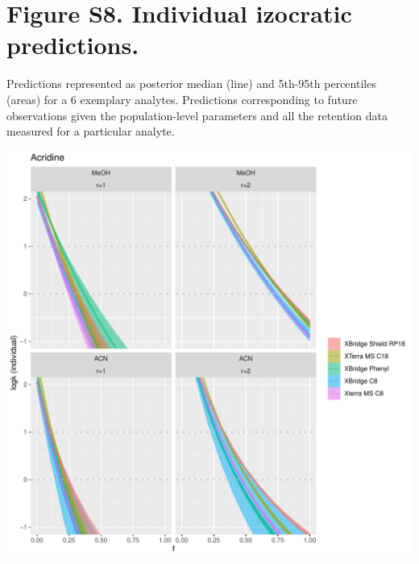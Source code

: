 \documentclass[
]{article}
\begin{document}
\newpage{}

\hypertarget{figure-s8.-individual-izocratic-predictions.}{%
\section{Figure S8. Individual izocratic
predictions.}\label{figure-s8.-individual-izocratic-predictions.}}

Predictions represented as posterior median (line) and 5th-95th
percentiles (areas) for a 6 exemplary analytes. Predictions
corresponding to future observations given the population-level
parameters and all the retention data measured for a particular analyte.

\includegraphics{../figures/izoparam/isopred/Acridine.individual.pdf}

\newpage{}
\end{document}
